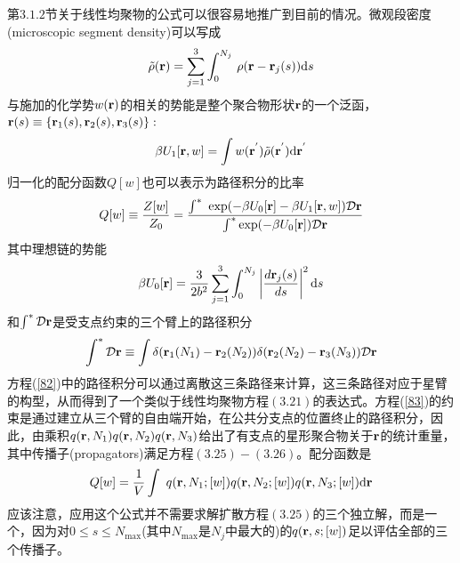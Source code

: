第$3.1.2$节关于线性均聚物的公式可以很容易地推广到目前的情况。微观段密度(microscopic segment density)可以写成
\begin{equation}
\tilde{\rho}(\mathbf{r})=\sum_{j=1}^3 \int_{0}^{N_j}\,\rho(\mathbf{r}-\mathbf{r}_{j}(s)) \mathrm{d}s
\end{equation}
与施加的化学势$w (\mathbf{r})$的相关的势能是整个聚合物形状$\mathbf{r}$的一个泛函，$\mathbf{r}(s)\equiv \left\{ \mathbf{r}_1(s),\mathbf{r}_2(s),\mathbf{r}_3(s) \right\}:$
\begin{equation}
\beta U_1[\mathbf{r},w]=\int w(\mathbf{r}^{'})\tilde{\rho}(\mathbf{r}^{'})\mathrm{d}\mathbf{r}^{'}
\end{equation}
归一化的配分函数$Q[w]$也可以表示为路径积分的比率
\begin{equation}
Q[w]\equiv \frac{Z[w]}{Z_0}=\frac{\int^{*}~\exp (-\beta U_0[\mathbf{r}]-\beta U_1[\mathbf{r},w])\mathcal{D}\mathbf{r}}{\int^{*} \exp (-\beta U_0[\mathbf{r}]) \mathcal{D}\mathbf{r}} \label{82}
\end{equation}
其中理想链的势能
\begin{equation}
\beta U_0[\mathbf{r}]=\frac{3}{2b^2}\sum_{j=1}^3\int_{0}^{N_j} \left| \frac{d\mathbf{r}_j(s)}{ds} \right|^2 \mathrm{d}s
\end{equation}
和$\int^{*}\mathcal{D}\mathbf{r}$是受支点约束的三个臂上的路径积分
\begin{equation}
\int^{*}\mathcal{D}\mathbf{r}\equiv \int \delta (\mathbf{r}_1(N_1)-\mathbf{r}_2(N_2))\delta (\mathbf{r}_2(N_2)-\mathbf{r}_3(N_3)) \mathcal{D}\mathbf{r}  \label{83}
\end{equation}
方程(\ref{82})中的路径积分可以通过离散这三条路径来计算，这三条路径对应于星臂的构型，从而得到了一个类似于线性均聚物方程$(3.21)$的表达式。方程(\ref{83})的约束是通过建立从三个臂的自由端开始，在公共分支点的位置终止的路径积分，因此，由乘积$q(\mathbf{r},N_1)q(\mathbf{r},N_2)q(\mathbf{r},N_3)$给出了有支点的星形聚合物关于$\mathbf{r}$的统计重量，其中传播子(propagators)满足方程$(3.25)-(3.26)$。配分函数是
\begin{equation}
Q[w]=\frac{1}{V}\int ~q(\mathbf{r},N_1;[w])q(\mathbf{r},N_2;[w])q(\mathbf{r},N_3;[w]) \mathrm{d}\mathbf{r}
\end{equation}
应该注意，应用这个公式并不需要求解扩散方程$(3.25)$的三个独立解，而是一个，因为对$0\leq s\leq N_{\max}$(其中$N_{\max}$是$N_j$中最大的)的$q(\mathbf{r},s;[w])$足以评估全部的三个传播子。

